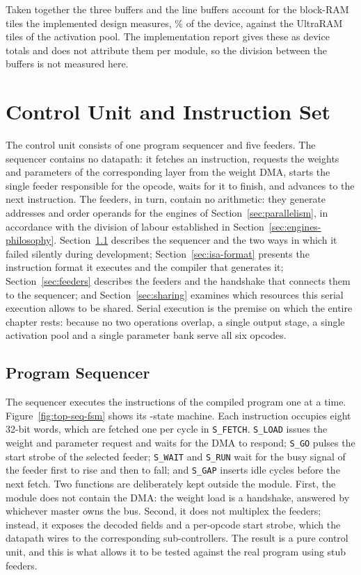 Taken together the three buffers and the line buffers account for the
\thBramBoard{} block-RAM tiles the implemented design measures,
\thBramPctBoard\% of the device, against the \thUramBoard{} UltraRAM tiles of
the activation pool. The implementation report gives these as device totals and
does not attribute them per module, so the division between the buffers is not
measured here.

\section{Control Unit and Instruction Set}
\label{sec:control}

The control unit consists of one program sequencer and five feeders. The
sequencer contains no datapath: it fetches an instruction, requests the weights
and parameters of the corresponding layer from the weight DMA, starts the single
feeder responsible for the opcode, waits for it to finish, and advances to the
next instruction. The feeders, in turn, contain no arithmetic: they generate
addresses and order operands for the engines of Section~\ref{sec:parallelism},
in accordance with the division of labour established in
Section~\ref{sec:engines-philosophy}.
Section~\ref{sec:sequencer} describes the sequencer and the two ways in which it
failed silently during development; Section~\ref{sec:isa-format} presents the
instruction format it executes and the compiler that generates it;
Section~\ref{sec:feeders} describes the feeders and the handshake that connects
them to the sequencer; and Section~\ref{sec:sharing} examines which resources
this serial execution allows to be shared. Serial execution is the premise on
which the entire chapter rests: because no two operations overlap, a single
output stage, a single activation pool and a single parameter bank serve all six
opcodes.

\subsection{Program Sequencer}
\label{sec:sequencer}

The sequencer executes the \thInstructions{} instructions of the compiled
program one at a time. Figure~\ref{fig:top-seq-fsm} shows its
\thSeqStates-state machine. Each instruction occupies eight 32-bit words, which
are fetched one per cycle in \texttt{S\_FETCH}. \texttt{S\_LOAD} issues the
weight and parameter request and waits for the DMA to respond; \texttt{S\_GO}
pulses the start strobe of the selected feeder; \texttt{S\_WAIT} and
\texttt{S\_RUN} wait for the busy signal of the feeder first to rise and then to
fall; and \texttt{S\_GAP} inserts \thGapCyc{} idle cycles before the next fetch.
Two functions are deliberately kept outside the module. First, the module does
not contain the DMA: the weight load is a handshake, answered by whichever
master owns the bus. Second, it does not multiplex the feeders; instead, it
exposes the decoded fields and a per-opcode start strobe, which the datapath
wires to the corresponding sub-controllers. The result is a pure control unit,
and this is what allows it to be tested against the real program using stub
feeders.

